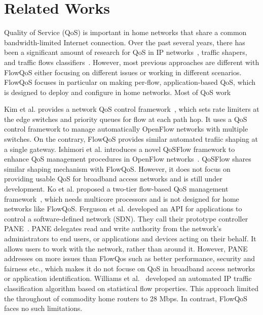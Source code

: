 \section{Related Works}
\label{sec:related-works}

Quality of Service (QoS) is important in home networks that share a common bandwidth-limited Internet connection. Over the past several years, there has been a significant amount of research for QoS in IP networks~\cite{aurrecoechea1998survey, mcdysan1999qos, newman1996ipsilon}, traffic shapers\cite{Meraki}, and traffic flows classifiers~\cite{roughan2004class}. However, most previous approaches are different with FlowQoS either focusing on different issues or working in different scenarios. FlowQoS focuses in particular on making per-flow, application-based QoS, which is designed to deploy and configure in home networks. Most of QoS work 

Kim et al. provides a network QoS control framework~\cite{kim2010automated}, which sets rate limiters at the edge switches and priority queues for flow at each path hop. It uses a QoS control framework to manage automatically OpenFlow networks with multiple switches. On the contrary, FlowQoS provides similar automated trafiic shaping at a single gateway. Ishimori et al. introduces a novel QoSFlow framework to enhance QoS management procedures in OpenFlow networks~\cite{ishimori2012automatic}. QoSFlow shares similar shaping mechanism with FlowQoS. However, it does not focus on providing usable QoS for broadband access networks and is still under development. 
Ko et al. proposed a two-tier flow-based QoS management framework~\cite{nam2013openqflow}, which needs multicore processors and is not designed for home networks like FlowQoS. Ferguson et al. developed an API for applications to control a software-defined network (SDN). They call their prototype controller PANE~\cite{ferguson2013participatory}. PANE delegates read and write authority from the network’s administrators to end users, or applications and devices acting on their behalf. It allows users to work with the network, rather than around it. However, PANE addresses on more issues than FlowQos such as better performance, security and fairness etc., which makes it do not focuse on QoS in broadband access networks or application identification. Williams et al.~\cite{williams2011real} developed an automated IP traffic classification algorithm based on statistical flow properties. This approach limited the throughout of commodity home routers to 28 Mbps. In contrast, FlowQoS faces no such limitations.\\


